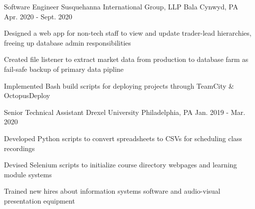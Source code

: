 

\begin{cventries}

  \cventry
  {Software Engineer} %
  {Susquehanna International Group, LLP} %
  {Bala Cynwyd, PA} %
  {Apr. 2020 - Sept. 2020} %
  {
    \begin{cvitems} %
      \item {Designed a web app for non-tech staff to view and update trader-lead hierarchies, freeing up database admin responsibilities}
      \item {Created file listener to extract market data from production to database farm as fail-safe backup of primary data pipline}
      \item {Implemented Bash build scripts for deploying projects through TeamCity \& OctopusDeploy}
    \end{cvitems}
  }

  \cventry
  {Senior Technical Assistant} %
  {Drexel University} %
  {Philadelphia, PA} %
  {Jan. 2019 - Mar. 2020} %
  {
    \begin{cvitems} %
      \item {Developed Python scripts to convert spreadsheets to CSVs for scheduling class recordings}
      \item {Devised Selenium scripts to initialize course directory webpages and learning module systems}
      \item {Trained new hires about information systems software and audio-visual presentation equipment}
    \end{cvitems}
  }

\end{cventries}
